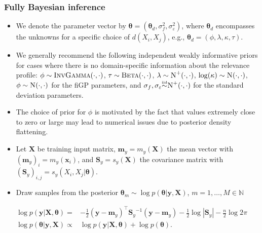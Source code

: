 \documentclass{snedecorbeamer}
\begin{document}
\begin{frame}%
  \label{frm:inference}
  \frametitle{Fully Bayesian inference}

  \begin{itemize}
  \item We denote the parameter vector by $\bm{\theta} =
    (\bm{\theta}_{d}, \sigma_f^2, \sigma_{\varepsilon}^2)$, where
    $\bm{\theta}_{d}$ encompasses the unknowns for a specific choice of
    $d(X_i, X_j)$, e.g., $\bm{\theta}_{d} = (\phi, \lambda, \kappa, \tau)$.
  \item We generally recommend the following independent weakly informative
    priors for cases where there is no domain-specific information about
    the relevance profile:
    $\phi \sim \textsc{InvGamma}(\cdot, \cdot)$,
    $\tau \sim \textsc{Beta}(\cdot, \cdot)$,
    $\lambda \sim \textsc{N}^{+}(\cdot, \cdot)$,
    $\log(\kappa) \sim \textsc{N}(\cdot, \cdot)$,
    $\phi\sim\textsc{N}(\cdot, \cdot)$
    for the fiGP parameters, and
    $\sigma_f, \sigma_{\varepsilon} \smash{\overset{\text{\tiny iid}}{\sim}} \textsc{N}^{+}(\cdot, \cdot)$
    for the standard deviation parameters.
  \item The choice
    of prior for $\phi$ is motivated by the fact that values extremely
    close to zero or large may lead to numerical issues due to posterior
    density flattening.
  \item Let $\mathbf{X}$ be training input matrix, $\mathbf{m}_y =
    m_y(\mathbf{X})$ the mean vector with %
    ${(\mathbf{m}_y)}_{i} = m_y(\mathbf{x}_i)$, and $\mathbf{S}_y =
    s_y(\mathbf{X})$ the covariance matrix with %
    ${(\mathbf{S}_y)}_{i, j} = s_y(X_i, X_j | {\bm{\theta}})$.
  \item Draw samples from the posterior $\bm{\theta}_m\sim\log p(\bm{\theta} |
    \mathbf{y}, \mathbf{X})$, $m = 1, \dots, M\in\mathbb{N}$
  \end{itemize}
  \begin{align}
    \label{eq:margina-likelihood}
    \log p(\mathbf{y} | \mathbf{X}, \bm{\theta})
    =& -\frac{1}{2}
       {(\mathbf{y} - \mathbf{m}_y)}^\top
       {\mathbf{S}_y}^{-1}
       {(\mathbf{y} - \mathbf{m}_y)}
       -\frac{1}{2}
       \log | \mathbf{S}_y |
       - \frac{n}{2} \log 2\pi \\
    \label{eq:parameter-posterior}
    \log p(\bm{\theta} | \mathbf{y}, \mathbf{X})
    \propto&
             \log p(\mathbf{y} | \mathbf{X}, \bm{\theta}) +
             \log p(\bm{\theta}).
  \end{align}
\end{frame}
\end{document}
